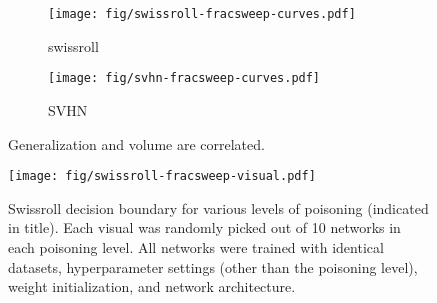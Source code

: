 \documentclass{article}
\begin{document}


    \begin{figure}
        \centering
        \begin{subfigure}{.48\textwidth}
            \centering
            \texttt{[image: fig/swissroll-fracsweep-curves.pdf]}
            \caption{\small swissroll}
            \label{fig:surfaceflat}
        \end{subfigure}
        \begin{subfigure}{.48\textwidth}
            \centering
            \texttt{[image: fig/svhn-fracsweep-curves.pdf]}
            \caption{\small SVHN}
            \label{fig:surfaceflat}
        \end{subfigure}
        \caption{\small Generalization and volume are correlated.}
        \label{fig:swissroll}
    \end{figure}

    \begin{figure}
        \centering
        \texttt{[image: fig/swissroll-fracsweep-visual.pdf]}
        \caption{\small Swissroll decision boundary for various levels of poisoning (indicated in title). Each visual was randomly picked out of 10 networks in each poisoning level. All networks were trained with identical datasets, hyperparameter settings (other than the poisoning level), weight initialization, and network architecture.}
        \label{fig:swissrollvisual}
    \end{figure}
\end{document}
